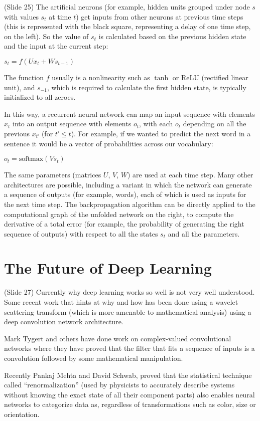 \documentclass[twocolumn]{article}
\begin{document}
(Slide 25) The artificial neurons (for example, hidden units grouped under node
\(s\) with values \(s_t\) at time \(t\)) get inputs from other neurons at
previous time steps (this is represented with the black square, representing a
delay of one time step, on the left). So the value of \(s_t\) is calculated
based on the previous hidden state and the input at the current step:

\(s_t=f(Ux_t + Ws_{t-1})\)

The function \(f\) usually is a nonlinearity such as \(\tanh\) or ReLU
(rectified linear unit), and \(s_{-1}\), which is required to calculate the
first hidden state, is typically initialized to all zeroes.

In this way, a recurrent neural network can map an input sequence with elements
\(x_t\) into an output sequence with elements \(o_t\), with each \(o_t\)
depending on all the previous \(x_{tʹ}\) (for \(tʹ \leq t\)). For example, if we
wanted to predict the next word in a sentence it would be a vector of
probabilities across our vocabulary:

\( o_t = \mathrm{softmax}(Vs_t)\)

The same parameters (matrices \(U\), \(V\), \(W\)) are used at each time
step. Many other architectures are possible, including a variant in which the
network can generate a sequence of outputs (for example, words), each of which
is used as inputs for the next time step. The backpropagation algorithm can be
directly applied to the computational graph of the unfolded network on the
right, to compute the derivative of a total error (for example, the probability
of generating the right sequence of outputs) with respect to all the states
\(s_t\) and all the parameters.

\section{The Future of Deep Learning}
(Slide 27) Currently why deep learning works so well is not very well
understood. Some recent work that hints at why and how has been done using a
wavelet scattering transform (which is more amenable to mathematical analysis)
using a deep convolution network architecture.

Mark Tygert and others have done work on complex-valued convolutional networks
where they have proved that the filter that fits a sequence of inputs is a
convolution followed by some mathematical manipulation.

Recently Pankaj Mehta and David Schwab, proved that the statistical technique
called “renormalization” (used by physicists to accurately describe systems
without knowing the exact state of all their component parts) also enables
neural networks to categorize data as, regardless of transformations such as
color, size or orientation.
\end{document}
